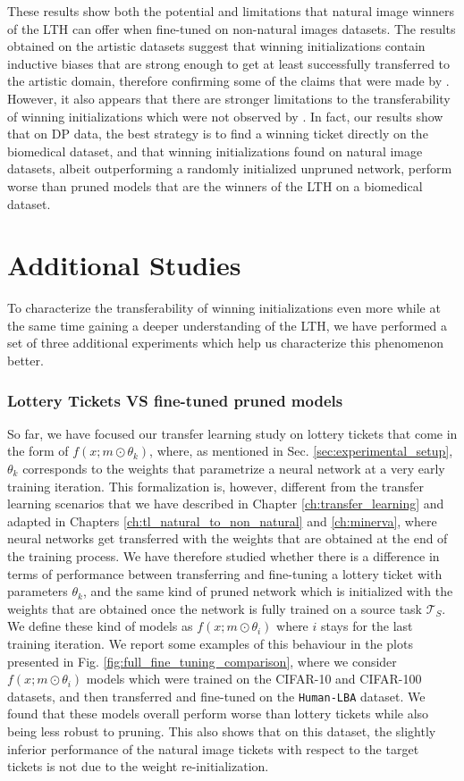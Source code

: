 These results show both the potential and limitations that natural image winners of the LTH can offer when fine-tuned on non-natural images datasets. The results obtained on the artistic datasets suggest that winning initializations contain inductive biases that are strong enough to get at least successfully transferred to the artistic domain, therefore confirming some of the claims that were made by \citet{morcos2019one}. However, it also appears that there are stronger limitations to the transferability of winning initializations which were not observed by \citet{morcos2019one}. In fact, our results show that on DP data, the best strategy is to find a winning ticket directly on the biomedical dataset, and that winning initializations found on natural image datasets, albeit outperforming a randomly initialized unpruned network, perform worse than pruned models that are the winners of the LTH on a biomedical dataset.

\section{Additional Studies}
\label{sec:additional_studies}
To characterize the transferability of winning initializations even more while at the same time gaining a deeper understanding of the LTH, we have performed a set of three additional experiments which help us characterize this phenomenon better. 

\subsubsection{Lottery Tickets VS fine-tuned pruned models}
So far, we have focused our transfer learning study on lottery tickets that come in the form of $f(x;m\odot\theta_k)$, where, as mentioned in Sec. \ref{sec:experimental_setup}, $\theta_k$ corresponds to the weights that parametrize a neural network at a very early training iteration. This formalization is, however, different from the transfer learning scenarios that we have described in Chapter \ref{ch:transfer_learning} and adapted in Chapters \ref{ch:tl_natural_to_non_natural} and \ref{ch:minerva}, where neural networks get transferred with the weights that are obtained at the end of the training process. We have therefore studied whether there is a difference in terms of performance between transferring and fine-tuning a lottery ticket with parameters $\theta_k$, and the same kind of pruned network which is initialized with the weights that are obtained once the network is fully trained on a source task $\mathcal{T}_S$. We define these kind of models as $f(x;m\odot\theta_i)$ where $i$ stays for the last training iteration. We report some examples of this behaviour in the plots presented in Fig. \ref{fig:full_fine_tuning_comparison}, where we consider $f(x;m\odot\theta_i)$ models which were trained on the CIFAR-10 and CIFAR-100 datasets, and then transferred and fine-tuned on the \texttt{Human-LBA} dataset. We found that these models overall perform worse than lottery tickets while also being less robust to pruning. This also shows that on this dataset, the slightly inferior performance of the natural image tickets with respect to the target tickets is not due to the weight re-initialization.

